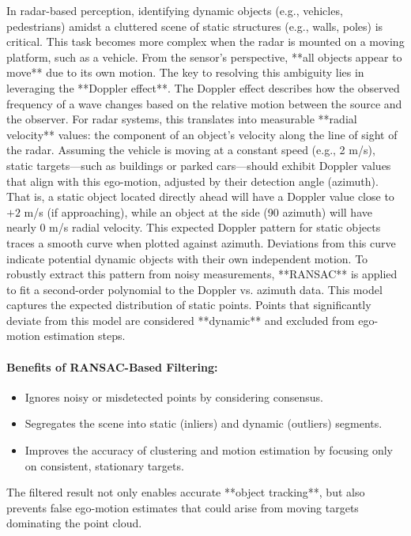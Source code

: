 In radar-based perception, identifying dynamic objects (e.g., vehicles, pedestrians) amidst a cluttered scene of static structures (e.g., walls, poles) is critical.
This task becomes more complex when the radar is mounted on a moving platform, such as a vehicle.
From the sensor's perspective, **all objects appear to move** due to its own motion. The key to resolving this ambiguity lies in leveraging the **Doppler effect**.
The Doppler effect describes how the observed frequency of a wave changes based on the relative motion between the source and the observer. For radar systems, this translates into measurable **radial velocity** values: the component of an object's velocity along the line of sight of the radar.
Assuming the vehicle is moving at a constant speed (e.g., 2 m/s), static targets—such as buildings or parked cars—should exhibit Doppler values that align with this ego-motion, adjusted by their detection angle (azimuth).
That is, a static object located directly ahead will have a Doppler value close to $+2$ m/s (if approaching), while an object at the side (90 azimuth) will have nearly 0 m/s radial velocity.
This expected Doppler pattern for static objects traces a smooth curve when plotted against azimuth. Deviations from this curve indicate potential dynamic objects with their own independent motion.
To robustly extract this pattern from noisy measurements, **RANSAC** is applied to fit a second-order polynomial to the Doppler vs. azimuth data. This model captures the expected distribution of static points.
Points that significantly deviate from this model are considered **dynamic** and excluded from ego-motion estimation steps.

\paragraph{Benefits of RANSAC-Based Filtering:}
\begin{itemize}
    \item Ignores noisy or misdetected points by considering consensus.
    \item Segregates the scene into static (inliers) and dynamic (outliers) segments.
    \item Improves the accuracy of clustering and motion estimation by focusing only on consistent, stationary targets.
\end{itemize}

The filtered result not only enables accurate **object tracking**, but also prevents false ego-motion estimates that could arise from moving targets dominating the point cloud.